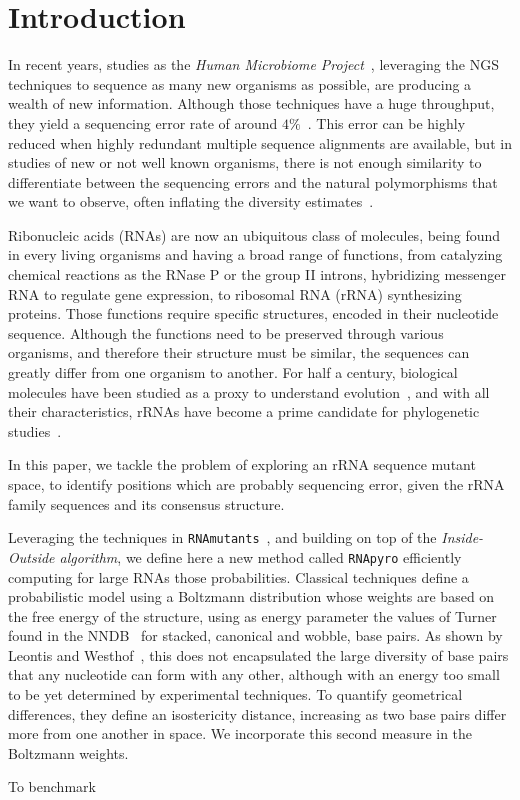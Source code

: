 \section{Introduction}
\label{sec:introduction}


In recent years, studies as the \emph{Human Microbiome Project}~\cite{Turnbaugh2007}, 
leveraging the NGS techniques to sequence as many new organisms 
as possible, are producing a wealth of new information. Although
those techniques have a huge throughput, they yield a sequencing error rate of around
$4\%$~\cite{Huse2007}. This error can be highly reduced  when highly 
redundant multiple sequence alignments 
 are available, but in studies of new or not well known organisms, there is not
 enough  similarity to differentiate between the sequencing errors and the natural 
 polymorphisms that we want to observe, often inflating the diversity estimates~\cite{Kunin2010}.
 
 Ribonucleic acids (RNAs) are  now  an ubiquitous class of molecules, being
found in every living organisms and having a broad range of functions, from catalyzing
chemical reactions as the RNase P or the group II introns,
hybridizing  messenger RNA to regulate gene expression,
to ribosomal RNA (rRNA) synthesizing proteins.
Those functions  require specific structures, 
encoded in their nucleotide sequence. Although the functions
need to be preserved through various organisms, and therefore
their structure must be similar,  the sequences
can greatly differ from one organism to another.
For half a century, biological molecules have been studied as a proxy to understand
evolution~\cite{Zuckerkandl1965}, and with all their characteristics, rRNAs have
become a prime candidate for phylogenetic studies~\cite{Olsen1986, Olsen1993}.

In this paper, we tackle the problem of exploring an rRNA sequence mutant space, to
identify positions which are probably sequencing error, given the  rRNA family sequences
and its consensus structure.

Leveraging the techniques  in \texttt{RNAmutants}~\cite{Waldispuhl2008}, and building on top 
of the \emph{Inside-Outside algorithm}, we define here a new method called \texttt{RNApyro}
efficiently computing for large RNAs those probabilities.
 Classical techniques define a probabilistic model using a Boltzmann distribution 
whose weights are based on the free energy of the structure, using as energy parameter
the values of Turner found in the NNDB~\cite{Turner2010}  for stacked, 
canonical and wobble, base pairs. As shown by Leontis and Westhof~\cite{Leontis2001},
this  does not encapsulated the large diversity of base pairs that any nucleotide
can form with any other, although with an energy too small to be yet determined
by experimental techniques. To quantify geometrical differences, they
 define an isostericity distance, increasing as two base pairs differ 
 more from one another in space. We incorporate this second measure in the Boltzmann weights.
 
To benchmark 